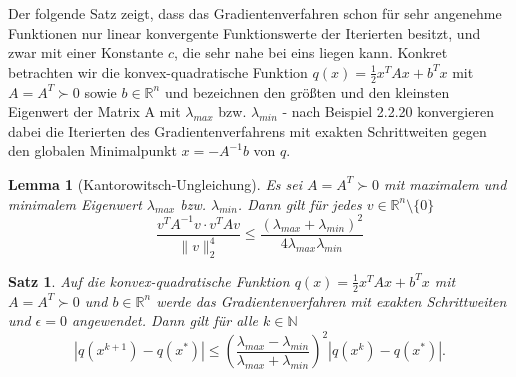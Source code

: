 \documentclass[11pt]{scrreprt}
\newcounter{thm}
\numberwithin{thm}{section}
\newtheorem{lemma}[thm]{Lemma}
\newtheorem{satz}[thm]{Satz}
\begin{document}
Der folgende Satz zeigt, dass das Gradientenverfahren schon für sehr angenehme Funktionen nur linear konvergente Funktionswerte der Iterierten besitzt, und zwar mit einer Konstante $c$, die sehr nahe bei eins liegen kann. Konkret betrachten wir die konvex-quadratische Funktion $q(x) = \frac{1}{2} x^T A x + b^T x$ mit $A= A^T \succ 0$ sowie $b \in \mathbb{R}^n$ und bezeichnen den größten und den kleinsten Eigenwert der Matrix A mit $\lambda_{max}$ bzw. $\lambda_{min}$ - nach Beispiel 2.2.20 konvergieren dabei die Iterierten des Gradientenverfahrens mit exakten Schrittweiten gegen den globalen Minimalpunkt $x = - A^{-1} b$ von $q$.
    
\begin{lemma}[Kantorowitsch-Ungleichung]
	Es sei $A = A^T \succ 0$ mit maximalem und minimalem Eigenwert $\lambda_{max}$ bzw. $\lambda_{min}$. Dann gilt für jedes $v \in \mathbb{R}^n \setminus \{ 0 \}$
	$$ \frac{v^T A^{-1} v \cdot v^{T} A v}{\| v \|_2^4} \leq \frac{\left(\lambda_{max}+ \lambda_{min} \right)^2}{4 \lambda_{max} \lambda_{min}} $$
\end{lemma}

\begin{satz}
	Auf die konvex-quadratische Funktion $q(x) = \frac{1}{2} x^T A x + b^T x$ mit $A = A^T \succ 0$ und $b \in \mathbb{R}^n$ werde das Gradientenverfahren mit exakten Schrittweiten und $\epsilon = 0$ angewendet. Dann gilt für alle $k \in \mathbb{N}$
	$$ |q(x^{k+1}) - q(x^*)| \leq \left( \frac{\lambda_{max} - \lambda_{min}}{\lambda_{max} + \lambda_{min}} \right)^2 |q(x^k) - q(x^*)|. $$
\end{satz}
\end{document}
